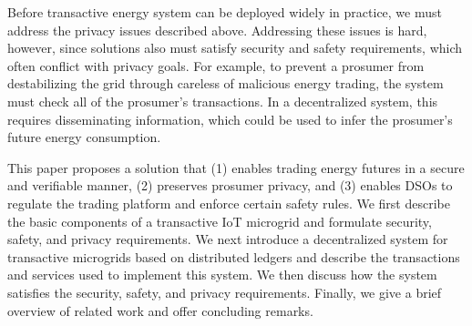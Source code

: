 Before transactive energy system can be deployed widely in practice,
we must address the privacy issues described above.  Addressing these
issues is hard, however, since solutions also must satisfy security
and safety requirements, which often conflict with privacy goals.  For
example, to prevent a prosumer from destabilizing the grid through
careless of malicious energy trading, the system must check all of the
prosumer's transactions.  In a decentralized system, this requires
disseminating information, which could be used to infer the prosumer's
future energy consumption.

      This
paper proposes a solution that (1) enables trading energy futures in a
secure and verifiable manner, (2) preserves prosumer privacy, and (3)
enables DSOs to regulate the trading platform and enforce certain
safety rules.    We first describe the basic components of a
transactive IoT microgrid and formulate security, safety, and privacy
requirements.  We next introduce a decentralized system for
transactive microgrids based on distributed ledgers and describe the
transactions and services used to implement this system.  We then
discuss how the system satisfies the security, safety, and privacy
requirements.  Finally, we give a brief overview of related work and
offer concluding remarks.

